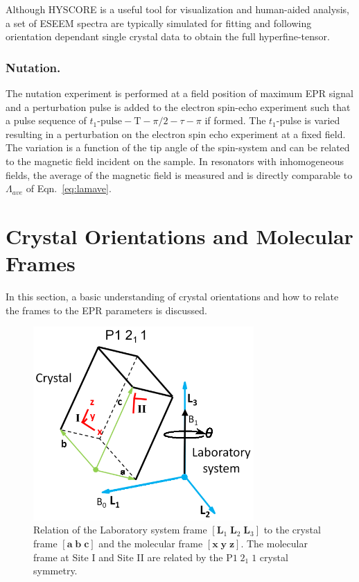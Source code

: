 Although HYSCORE is a useful tool for visualization and human-aided analysis, a set of ESEEM spectra are typically simulated for fitting and following orientation dependant single crystal data to obtain the full hyperfine-tensor. \cite{Shane1994SingleCrystalESEEM}

\subsubsection*{Nutation.}
The nutation experiment is performed at a field position of maximum EPR signal and a perturbation pulse is added to the electron spin-echo experiment such that a pulse sequence of ${t_1\text{-pulse}\!-\!\text{T}\!-\!\pi/2\!-\!\tau\!-\!\pi}$ if formed. The $t_1$-pulse is varied resulting in a perturbation on the electron spin echo experiment at a fixed field. The variation is a function of the tip angle of the spin-system and can be related to the magnetic field incident on the sample. In resonators with inhomogeneous fields, the average of the magnetic field is measured and is directly comparable to $\Lambda_{ave}$ of Eqn.~\ref{eq:lamave}.

\section{Crystal Orientations and Molecular Frames}
In this section, a basic understanding of crystal orientations and how to relate the frames to the EPR parameters is discussed. 

\begin{figure}[ht]
 \centering
 \includegraphics[width=0.75\textwidth]{Kapitel/Ch1-images/CrystalRotation.eps}
 \caption[Single crystal EPR frames.]{Relation of the Laboratory system frame $[\mathbf{L}_1\; \mathbf{L}_2\; \mathbf{L}_3]$ to the crystal frame $[\mathbf{a}\; \mathbf{b}\; \mathbf{c}]$ and the molecular frame $[\mathbf{x}\; \mathbf{y}\; \mathbf{z}]$. The molecular frame at Site I and Site II are related by the P$1\;2_1\;1$ crystal symmetry.}
 \label{fig:CrystalOrientation}
\end{figure}

